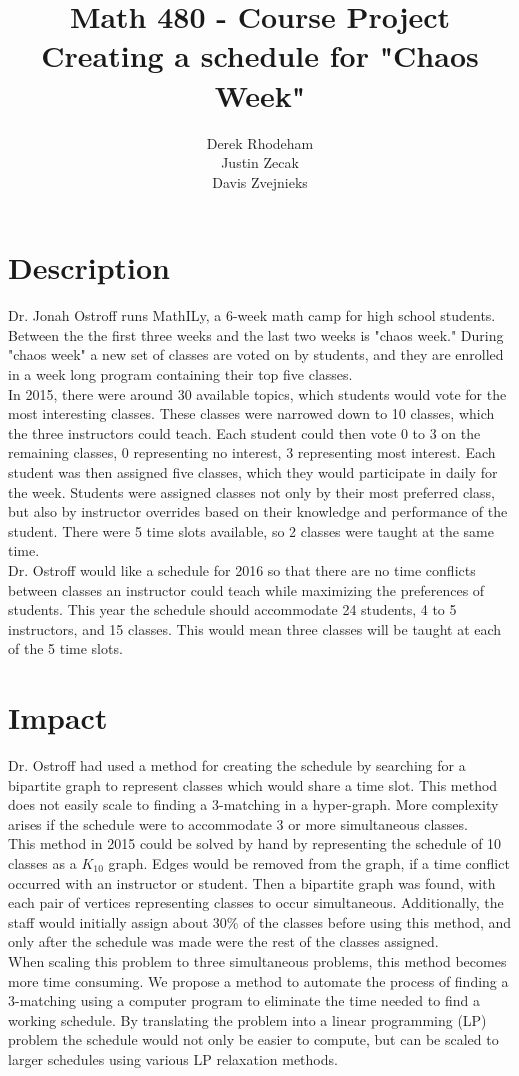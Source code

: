 \documentclass[11pt]{article}
\title{\textbf{Math 480 - Course Project}
			  \\Creating a schedule for "Chaos Week"}
\author{Derek Rhodeham\\
		Justin Zecak\\
		Davis Zvejnieks}
\date{}
\begin{document}
\maketitle

\section{Description}
Dr. Jonah Ostroff runs MathILy, a 6-week math camp for high school students. Between the the first three weeks and the last two weeks is "chaos week." During "chaos week" a new set of classes are voted on by students, and they are enrolled in a week long program containing their top five classes.\\
\indent In 2015, there were around 30 available topics, which students would vote for the most interesting classes. These classes were narrowed down to 10 classes, which the three instructors could teach. Each student could then vote 0 to 3 on the remaining classes, 0 representing no interest, 3 representing most interest. Each student was then assigned five classes, which they would participate in daily for the week. Students were assigned classes not only by their most preferred class, but also by instructor overrides based on their knowledge and performance of the student. There were 5 time slots available, so 2 classes were taught at the same time.\\
\indent Dr. Ostroff would like a schedule for 2016 so that there are no time conflicts between classes an instructor could teach while maximizing the preferences of students. This year the schedule should accommodate 24 students, 4 to 5 instructors, and 15 classes. This would mean three classes will be taught at each of the 5 time slots.


\section{Impact}
Dr. Ostroff had used a method for creating the schedule by searching for a bipartite graph to represent classes which would share a time slot. This method does not easily scale to finding a 3-matching in a hyper-graph. More complexity arises if the schedule were to accommodate 3 or more simultaneous classes.\\
\indent This method in 2015 could be solved by hand by representing the schedule of 10 classes as a $K_{10}$ graph. Edges would be removed from the graph, if a time conflict occurred with an instructor or student. Then a bipartite graph was found, with each pair of vertices representing classes to occur simultaneous. Additionally, the staff would initially assign about 30\% of the classes before using this method, and only after the schedule was made were the rest of the classes assigned.\\
\indent When scaling this problem to three simultaneous problems, this method becomes more time consuming. We propose a method to automate the process of finding a 3-matching using a computer program to eliminate the time needed to find a working schedule. By translating the problem into a linear programming (LP) problem the schedule would not only be easier to compute, but can be scaled to larger schedules using various LP relaxation methods.
\end{document}

